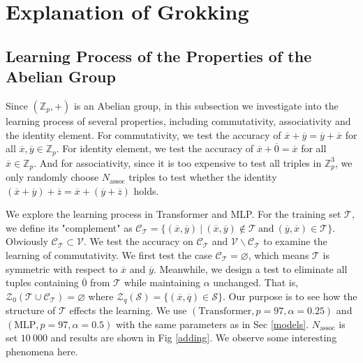 \documentclass{article}
\begin{document}
\section{Explanation of Grokking}

\subsection{Learning Process of the Properties of the Abelian Group}
\label{abel}

Since $(\mathbb{Z}_p, +)$ is an Abelian group, in this subsection we investigate into the learning process of several properties, including commutativity, associativity and the identity element. For commutativity, we test the accuracy of $\overline{x} + \overline{y} = \overline{y} + \overline{x}$ for all $\overline{x},\overline{y}\in\mathbb{Z}_p$. For identity element, we test the accuracy of $\overline{x} + \overline{0} = \overline{x}$ for all $\overline{x}\in\mathbb{Z}_p$. And for associativity, since it is too expensive to test all triples in $\mathbb{Z}_p^3$, we only randomly choose $N_{\text{assoc}}$ triples to test whether the identity $(\overline{x} + \overline{y}) + \overline{z} = \overline{x} + (\overline{y} + \overline{z})$ holds.

We explore the learning process in Transformer and MLP. For the training set $\mathcal{T}$, we define its "complement" as $\mathcal{C_T} = \lbrace \left.(\overline{x}, \overline{y})\ \right|\ (\overline{x}, \overline{y}) \notin \mathcal{T}\ \text{and}\ (\overline{y}, \overline{x}) \in \mathcal{T}\rbrace$. Obviously $\mathcal{C_T} \subset \mathcal{V}$. We test the accuracy on $\mathcal{C_T}$ and $\mathcal{V}\backslash\mathcal{C_T}$ to examine the learning of commutativity. We first test the case $\mathcal{C_T} = \varnothing$, which means $\mathcal{T}$ is symmetric with respect to $\overline{x}$ and $\overline{y}$. Meanwhile, we design a test to eliminate all tuples containing $\overline{0}$ from $\mathcal{T}$ while maintaining $\alpha$ unchanged. That is, $\mathcal{Z}_0(\mathcal{T}\cup\mathcal{C_T}) = \varnothing$ where $\mathcal{Z}_q(\mathcal{S}) = \lbrace(\overline{x},\overline{q}) \in \mathcal{S}\rbrace$. Our purpose is to see how the structure of $\mathcal{T}$ effects the learning. We use $(\text{Transformer}, p = 97, \alpha = 0.25)$ and $(\text{MLP}, p = 97, \alpha = 0.5)$ with the same parameters as in Sec \ref{models}. $N_\text{assoc}$ is set $10\ 000$ and results are shown in Fig \ref{adding}. We observe some interesting phenomena here.
\end{document}
